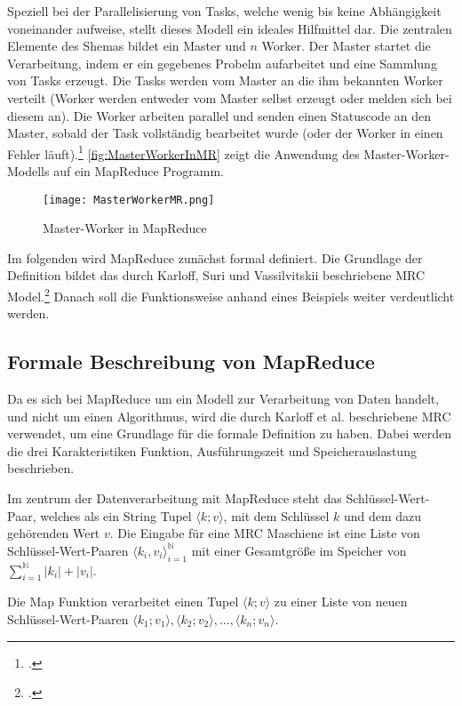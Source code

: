 Speziell bei der Parallelisierung von Tasks, welche wenig bis keine Abhängigkeit voneinander aufweise, stellt dieses Modell ein ideales Hilfmittel dar. Die zentralen Elemente des Shemas bildet ein Master und $n$ Worker. Der Master startet die Verarbeitung, indem er ein gegebenes Probelm aufarbeitet und eine Sammlung von Tasks erzeugt.  Die Tasks werden vom Master an die ihm bekannten Worker verteilt (Worker werden entweder vom Master selbst erzeugt oder melden sich bei diesem an). Die Worker arbeiten parallel und senden einen Statuscode an den Master, sobald der Task vollständig bearbeitet wurde (oder der Worker in einen Fehler läuft).\footcite[Vgl.][S. 80 ff]{Fey.2008} \autoref{fig:MasterWorkerInMR} zeigt die Anwendung des Master-Worker-Modells auf ein MapReduce Programm.

\begin{figure}[h]
	\texttt{[image: MasterWorkerMR.png]}
	\caption{Master-Worker in MapReduce\footnotemark}
	\label{fig:MasterWorkerInMR}
\end{figure}

Im folgenden wird MapReduce zunächst formal definiert. Die Grundlage der Definition bildet das durch Karloff, Suri und Vassilvitskii beschriebene \ac{MRC} Model.\footcite[S. 3 f]{Karloff.2010} Danach soll die Funktionsweise anhand eines Beispiels weiter verdeutlicht werden.

\subsection{Formale Beschreibung von MapReduce}\label{subsec:FormaleBeschreibung}
Da es sich bei MapReduce um ein Modell zur Verarbeitung von Daten handelt, und nicht um einen Algorithmus, wird die durch Karloff et al. beschriebene \ac{MRC} verwendet, um eine Grundlage für die formale Definition zu haben. Dabei werden die drei Karakteristiken Funktion, Ausführungszeit und Speicherauslastung beschrieben.

Im zentrum der Datenverarbeitung mit MapReduce steht das Schlüssel-Wert-Paar, welches als ein String Tupel $\langle k; v \rangle$, mit dem Schlüssel $k$ und dem dazu gehörenden Wert $v$. Die Eingabe für eine \ac{MRC} Maschiene ist eine Liste von Schlüssel-Wert-Paaren $\langle k_i, v_i \rangle_{i=1}^{\mathbb{N}}$ mit einer Gesamtgröße im Speicher von $\sum_{i=1}^{\mathbb{N}}|k_i|+|v_i|$.

Die Map Funktion verarbeitet einen Tupel $\langle k; v \rangle$ zu einer Liste von neuen Schlüssel-Wert-Paaren $\langle k_1; v_1 \rangle, \langle k_2; v_2 \rangle, \dots, \langle k_n; v_n \rangle$.

